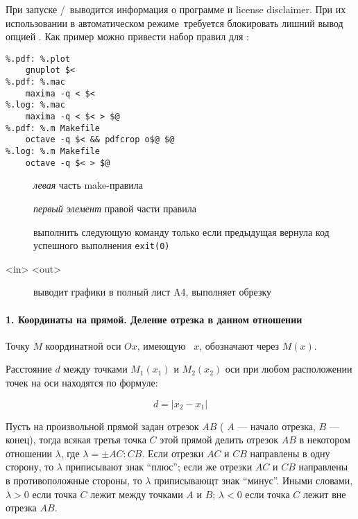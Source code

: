 
При запуске \maxima/\octave\ выводится информация о программе и license
disclaimer. При их использовании в автоматическом режиме\ требуется блокировать лишний вывод опцией . Как
пример можно привести набор правил для :

\begin{verbatim}
%.pdf: %.plot
    gnuplot $<
%.pdf: %.mac
    maxima -q < $<
%.log: %.mac
    maxima -q < $< > $@
%.pdf: %.m Makefile
    octave -q $< && pdfcrop o$@ $@
%.log: %.m Makefile
    octave -q $< > $@
\end{verbatim}

\begin{description}
\item[] \emph{левая} часть make-правила
\item[\var{\$<}] \emph{первый элемент} правой части правила
\item[\var{\&\&}] выполнить следующую команду только если предыдущая вернула код
успешного выполнения \verb|exit(0)|
\item[ <in> <out>]  выводит графики в полный
лист A4,  выполняет обрезку
\end{description}

\secdown


\paragraph{1. Координаты на прямой. Деление отрезка в данном отношении}

Точку $M$ координатной оси $Ox$, имеющую \ $x$,
обозначают через $M(x)$.

Расстояние $d$ между точками $M_{1}(x_{1})$ и $M_{2}(x_{2})$ оси при любом
расположении точек на оси находятся по формуле:

\begin{equation}\label{danko1}
d=|x_{2}-x_{1}|
\end{equation}

Пусть на произвольной прямой задан отрезок $AB$ ( $A$ --- начало отрезка, $B$
--- конец), тогда всякая третья точка $C$ этой прямой делить отрезок $AB$ в
некотором отношении $\lambda$, где $\lambda= \pm AC:CB$. Если отрезки $AC$ и
$CB$ направлены в одну сторону, то $\lambda$ приписывают знак ``плюс''; если же
отрезки $AC$ и $CB$ направлены в противоположные стороны, то $\lambda$
приписывающт знак ``минус''. Иными словами, $\lambda>0$ если точка $C$ лежит
между точками $A$ и $B$; $\lambda < 0$ если точка $C$ лежит вне отрезка $AB$.

